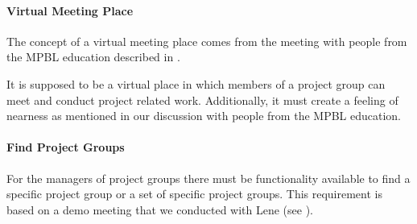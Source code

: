 \paragraph{Virtual Meeting Place}
The concept of a virtual meeting place comes from the meeting with people from the MPBL education described in . 
\begin{comment}
From the interview with Lene in \appref{sec:lene} we know that she manually types a list of groups and their members into Moodle.
In the interview with Jette and Pia (\appref{sec:jettePia}) we learn that a member of the \admpers{} is responsible for the formed groups. 
This implies that there exist records of the composition of the groups.   
In contrast to the these two interviews Morten explains in an interview (\appref{sec:morten}) that on the MPBL education the \admpers{} do not manage the project groups.

Based on this information we decide that we will make a virtual meeting place that reflects the project groups that exist on Aalborg university. 
We decide this knowing that it will cause additional work for the \admpers{} on the MPBL education. 
We will elaborate on the virtual meeting place in \chapref{chap:analdesign}.
\end{comment}
It is supposed to be a virtual place in which members of a project group can meet and conduct project related work.
Additionally, it must create a feeling of nearness as mentioned in our discussion with people from the MPBL education.


\paragraph{Find Project Groups}
\begin{comment}
We deem that it is necessary to create a list with all the project groups that exist.
This should be available to the part of our target group that manage the project groups.
In our third sprint we held a demo meeting where Lene mentioned that it was difficult to find a project group when there were many project groups in the system(see \appref{sec:lenedemoone}).
We decide to make functionality that will allow users to search in the list of project groups.
The implementation of this concrete problem will be addressed in \secref{sec:manProjGrpImpl}.
\end{comment}
For the managers of project groups there must be functionality available to find a specific project group or a set of specific project groups.
This requirement is based on a demo meeting that we conducted with Lene (see ).



